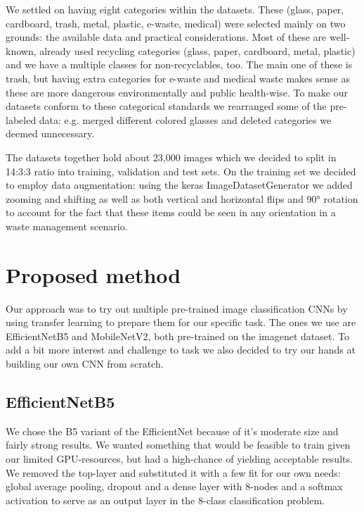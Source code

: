 \documentclass{article}
\begin{document}
	We settled on having eight categories within the datasets. These (glass, paper, cardboard, trash, metal, plastic, e-waste, medical) were selected mainly on two grounds: the available data and practical considerations. Most of these are well-known, already used recycling categories (glass, paper, cardboard, metal, plastic) and we have a multiple classes for non-recyclables, too. The main one of these is trash, but having extra categories for e-waste and medical waste makes sense as these are more dangerous environmentally and public health-wise. To make our datasets conform to these categorical standards we rearranged some of the pre-labeled data: e.g. merged different colored glasses and deleted categories we deemed unnecessary.
	
	The datasets together hold about 23,000 images which we decided to split in 14:3:3 ratio into training, validation and test sets. On the training set we decided to employ data augmentation: using the keras ImageDatasetGenerator we added zooming and shifting as well as both vertical and horizontal flips and 90° rotation to account for the fact that these items could be seen in any orientation in a waste management scenario.
	
	\section{Proposed method}
	
	Our approach was to try out multiple pre-trained image classification CNNs by using transfer learning to prepare them for our specific task. The ones we use are EfficientNetB5 and MobileNetV2, both pre-trained on the imagenet dataset. To add a bit more interest and challenge to task we also decided to try our hands at building our own CNN from scratch.
	
	\subsection{EfficientNetB5}
	
	We chose the B5 variant of the EfficientNet because of it's moderate size and fairly strong results. We wanted something that would be feasible to train given our limited GPU-resources, but had a high-chance of yielding acceptable results. We removed the top-layer and substituted it with a few fit for our own needs: global average pooling, dropout and a dense layer with 8-nodes and a softmax activation to serve as an output layer in the 8-class classification problem.
	
\end{document}
